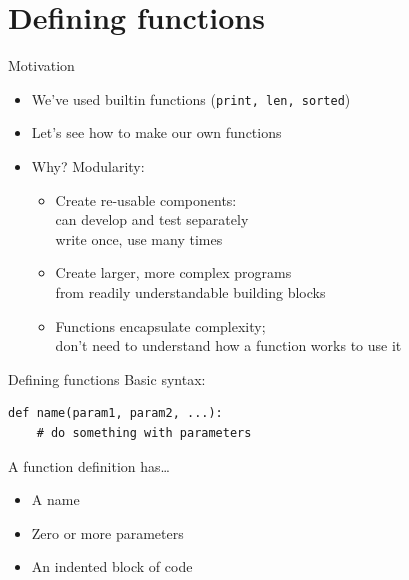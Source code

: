 \documentclass[aspectratio=169,usenames,dvipsnames]{beamer}
\begin{document}
\section{Defining functions}
\frame{\tableofcontents[currentsection]}

\begin{frame}{Motivation}
    \begin{itemize}
        \item We've used builtin functions (\lstinline{print, len, sorted})
        \item Let's see how to make our own functions
        \item Why? Modularity:
            \pause
            \begin{itemize}
                \item Create re-usable components: \\
                    can develop and test separately \\
                    write once, use many times
                \item Create larger, more complex programs \\
                    from readily understandable building blocks
                \item Functions encapsulate complexity; \\
                    don't need to understand how a function works to use it
            \end{itemize}
    \end{itemize}
\end{frame}

\begin{frame}[fragile]{Defining functions}
Basic syntax:
\begin{lstlisting}
def name(param1, param2, ...):
    # do something with parameters
\end{lstlisting}

    A function definition has\dots
    \begin{itemize}
        \item A name
        \item Zero or more parameters
        \item An indented block of code
    \end{itemize}
\end{frame}
\end{document}
